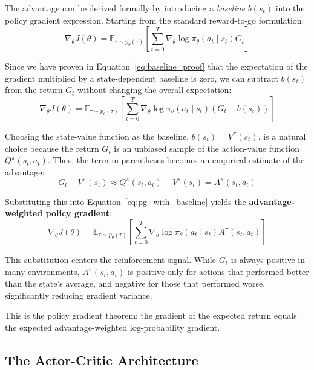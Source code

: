 \documentclass{book}
\begin{document}
The advantage can be derived formally by introducing a \emph{baseline} $b(s_t)$ into the policy gradient expression. Starting from the standard reward-to-go formulation:
\begin{equation}
\label{eq:pg_starting_point}
\nabla_\theta J(\theta) = \mathbb{E}_{\tau \sim p_\theta(\tau)} \left[ \sum_{t=0}^{T} \nabla_\theta \log \pi_\theta(a_t \mid s_t) G_t \right]
\end{equation}

Since we have proven in Equation~\ref{eq:baseline_proof} that the expectation of the gradient multiplied by a state-dependent baseline is zero, we can subtract $b(s_t)$ from the return $G_t$ without changing the overall expectation:
\begin{equation}
\label{eq:pg_with_baseline}
\nabla_\theta J(\theta) = \mathbb{E}_{\tau \sim p_\theta(\tau)} \left[ \sum_{t=0}^{T} \nabla_\theta \log \pi_\theta(a_t \mid s_t) (G_t - b(s_t)) \right]
\end{equation}

Choosing the state-value function as the baseline, $b(s_t) = V^\pi(s_t)$, is a natural choice because the return $G_t$ is an unbiased sample of the action-value function $Q^\pi(s_t, a_t)$. Thus, the term in parentheses becomes an empirical estimate of the advantage:
\begin{equation}
G_t - V^\pi(s_t) \approx Q^\pi(s_t, a_t) - V^\pi(s_t) = A^\pi(s_t, a_t)
\end{equation}

Substituting this into Equation~\ref{eq:pg_with_baseline} yields the \textbf{advantage-weighted policy gradient}:
\begin{equation}
\label{eq:advantage_pg}
\nabla_\theta J(\theta) = \mathbb{E}_{\tau \sim p_\theta(\tau)} \left[ \sum_{t=0}^{T} \nabla_\theta \log \pi_\theta(a_t \mid s_t) A^\pi(s_t, a_t) \right]
\end{equation}

This substitution centers the reinforcement signal. While $G_t$ is always positive in many environments, $A^\pi(s_t, a_t)$ is positive only for actions that performed better than the state's average, and negative for those that performed worse, significantly reducing gradient variance.


This is the policy gradient theorem: the gradient of the expected return
equals the expected advantage-weighted log-probability gradient.

\subsection{The Actor-Critic Architecture}
\label{sec:actor-critic-architecture}
\end{document}

